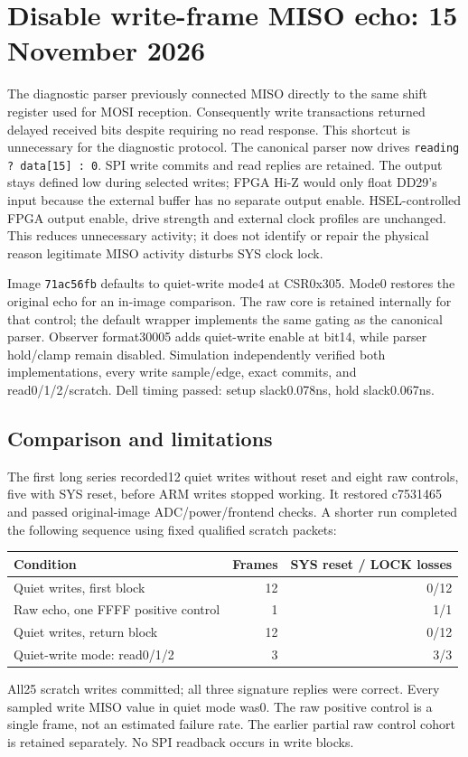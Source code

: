 \clearpage
\section{Disable write-frame MISO echo: 15 November 2026}
The diagnostic parser previously connected MISO directly to the same shift
register used for MOSI reception. Consequently write transactions returned
delayed received bits despite requiring no read response. This shortcut is
unnecessary for the diagnostic protocol. The canonical parser now drives
\texttt{reading ? data[15] : 0}. SPI write commits and read replies are retained.
The output stays defined low during selected writes; FPGA Hi-Z would only
float DD29's input because the external buffer has no separate output enable.
HSEL-controlled FPGA output enable, drive strength and external clock profiles
are unchanged. This reduces unnecessary activity; it does not identify or
repair the physical reason legitimate MISO activity disturbs SYS clock lock.

Image \texttt{71ac56fb} defaults to quiet-write mode4 at CSR0x305. Mode0
restores the original echo for an in-image comparison. The raw core is retained
internally for that control; the default wrapper implements the same gating
as the canonical parser. Observer format30005 adds quiet-write enable at bit14,
while parser hold/clamp remain disabled. Simulation independently verified both
implementations, every write sample/edge, exact commits, and read0/1/2/scratch.
Dell timing passed: setup slack0.078ns, hold slack0.067ns.

\subsection{Comparison and limitations}
The first long series recorded12 quiet writes without reset and eight raw
controls, five with SYS reset, before ARM writes stopped working. It restored
c7531465 and passed original-image ADC/power/frontend checks. A shorter run
completed the following sequence using fixed qualified scratch packets:
\begin{center}\begin{tabular}{lrr}\toprule
Condition & Frames & SYS reset / LOCK losses\\\midrule
Quiet writes, first block &12&0/12\\
Raw echo, one FFFF positive control &1&1/1\\
Quiet writes, return block &12&0/12\\
Quiet-write mode: read0/1/2 &3&3/3\\\bottomrule
\end{tabular}\end{center}
All25 scratch writes committed; all three signature replies were correct.
Every sampled write MISO value in quiet mode was0. The raw positive control
is a single frame, not an estimated failure rate. The earlier partial raw
control cohort is retained separately. No SPI readback occurs in write blocks.

